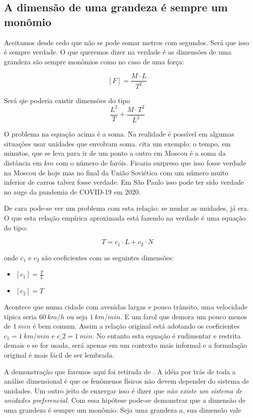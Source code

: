 \subsection{A dimensão de uma grandeza é sempre um monômio}

Aceitamos desde cedo que não se pode somar metros com segundos. Será que isso é sempre verdade. O que queremos dizer na verdade é as dimensões de uma grandeza são sempre monômios como no caso de uma força:

\[
  [F] = \frac{M\cdot L}{T^2}
\]

Será qie poderia existir dimensões do tipo
\[
\frac{L^2}{T} + \frac{M\cdot T^2}{L^3}
\]

O problema na equação acima é a soma. Na realidade é possível em algumas situações usar unidades que envolvam soma. \cite{Barenblatt96} cita um exemplo: o tempo, em minutos, que se leva para ir de um ponto a outro em Moscou é a soma da distância em $km$ com o número de faróis. Ficaria surpreso que isso fosse verdade na Moscou de hoje mas no final da União Soviética com um número muito inferior de carros talvez fosse verdade. Em São Paulo isso pode ter sido verdade no auge da pandemia de COVID-19 em 2020.

De cara pode-se ver um problema com esta relação: se mudar as unidades, já era. O que esta relação empírica aproximada está fazendo na verdade é uma equação do tipo:

\[
T = c_1 \cdot L + c_2 \cdot N
\]

onde $c_1$ e $c_2$ são coeficientes com as seguintes dimensões:

\begin{itemize}
\item $[c_1] = \frac{T}{L}$
\item $[c_2] = T$
\end{itemize}

Acontece que numa cidade com avenidas largas e pouco trânsito, uma velocidade típica seria $60\:km/h$ ou seja $1\:km/min$. E um farol que demora um pouco menos de $1\:min$ é bem comum. Assim a relação original está adotando os coeficientes $c_1 = 1 \:km/min$ e $c\_2 = 1\: min$. No entanto esta equação é rudimentar e restrita demais e se for usada, será apenas em um contexto mais informal e a formulação original é mais fácil de ser lembrada.

A demonstração que faremos aqui foi retirada de \cite{Barenblatt96}. A idéia por trás de toda a análise dimensional é que os fenômenos físicos não devem depender do sistema de unidades. Um outro jeito de enxergar isso é dizer que \emph{não existe um sistema de unidades preferencial}. Com essa hipótese pode-se demonstrar que a dimensão de uma grandeza é sempre um monômio. Seja uma grandeza $a$, sua dimensão vale


